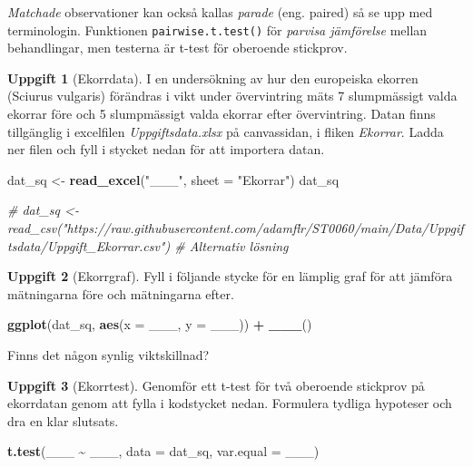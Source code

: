 \documentclass[
]{book}
\newenvironment{Shaded}{\begin{snugshade}}{\end{snugshade}}
\newcommand{\AttributeTok}[1]{\textcolor[rgb]{0.13,0.29,0.53}{#1}}
\newcommand{\CommentTok}[1]{\textcolor[rgb]{0.56,0.35,0.01}{\textit{#1}}}
\newcommand{\FunctionTok}[1]{\textcolor[rgb]{0.13,0.29,0.53}{\textbf{#1}}}
\newcommand{\NormalTok}[1]{#1}
\newcommand{\OtherTok}[1]{\textcolor[rgb]{0.56,0.35,0.01}{#1}}
\newcommand{\SpecialCharTok}[1]{\textcolor[rgb]{0.81,0.36,0.00}{\textbf{#1}}}
\newcommand{\StringTok}[1]{\textcolor[rgb]{0.31,0.60,0.02}{#1}}
\theoremstyle{definition}
\theoremstyle{definition}
\theoremstyle{definition}
\newtheorem{exercise}{Uppgift}[chapter]
\theoremstyle{definition}
\theoremstyle{remark}
\begin{document}
\emph{Matchade} observationer kan också kallas \emph{parade} (eng. paired) så se upp med terminologin. Funktionen \texttt{pairwise.t.test()} för \emph{parvisa jämförelse} mellan behandlingar, men testerna är t-test för oberoende stickprov.

\begin{exercise}[Ekorrdata]

I en undersökning av hur den europeiska ekorren (Sciurus vulgaris) förändras i vikt under övervintring mäts 7 slumpmässigt valda ekorrar före och 5 slumpmässigt valda ekorrar efter övervintring. Datan finns tillgänglig i excelfilen \emph{Uppgiftsdata.xlsx} på canvassidan, i fliken \emph{Ekorrar}. Ladda ner filen och fyll i stycket nedan för att importera datan.

\begin{Shaded}
\begin{Highlighting}[]
\NormalTok{dat\_sq }\OtherTok{\textless{}{-}} \FunctionTok{read\_excel}\NormalTok{(}\StringTok{"\_\_\_"}\NormalTok{, }\AttributeTok{sheet =} \StringTok{"Ekorrar"}\NormalTok{)}
\NormalTok{dat\_sq}

\CommentTok{\# dat\_sq \textless{}{-} read\_csv("https://raw.githubusercontent.com/adamflr/ST0060/main/Data/Uppgiftsdata/Uppgift\_Ekorrar.csv") \# Alternativ lösning}
\end{Highlighting}
\end{Shaded}

\end{exercise}

\begin{exercise}[Ekorrgraf]
Fyll i följande stycke för en lämplig graf för att jämföra mätningarna före och mätningarna efter.

\begin{Shaded}
\begin{Highlighting}[]
\FunctionTok{ggplot}\NormalTok{(dat\_sq, }\FunctionTok{aes}\NormalTok{(}\AttributeTok{x =}\NormalTok{ \_\_\_, }\AttributeTok{y =}\NormalTok{ \_\_\_)) }\SpecialCharTok{+}
  \FunctionTok{\_\_\_}\NormalTok{()}
\end{Highlighting}
\end{Shaded}

Finns det någon synlig viktskillnad?
\end{exercise}

\begin{exercise}[Ekorrtest]

Genomför ett t-test för två oberoende stickprov på ekorrdatan genom att fylla i kodstycket nedan. Formulera tydliga hypoteser och dra en klar slutsats.

\begin{Shaded}
\begin{Highlighting}[]
\FunctionTok{t.test}\NormalTok{(\_\_\_ }\SpecialCharTok{\textasciitilde{}}\NormalTok{ \_\_\_, }\AttributeTok{data =}\NormalTok{ dat\_sq, }\AttributeTok{var.equal =}\NormalTok{ \_\_\_)}
\end{Highlighting}
\end{Shaded}

\end{exercise}
\end{document}
